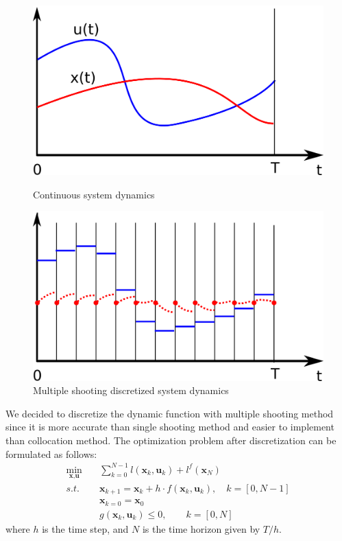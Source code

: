 \documentclass{article}
\begin{document}
\begin{figure}[h!]
    \begin{minipage}{0.4\textwidth}
        \centering
        \includegraphics[width=\textwidth]{images/xu_cont.png}
        \caption{Continuous system dynamics}
        \label{fig:continuous-system-dynamics}
    \end{minipage}
    \hfill
    \begin{minipage}{0.4\textwidth}
        \centering
        \includegraphics[width=\textwidth]{images/xu_gap.png}
        \caption{Multiple shooting discretized system dynamics}
        \label{fig:multiple-shooting-system-dynamics}
    \end{minipage}
    \label{fig:compare-system-dynamics}
\end{figure}

We decided to discretize the dynamic function with multiple shooting method since it is more accurate than single shooting method and easier to implement than collocation method. The optimization problem after discretization can be formulated as follows:
\begin{align}
    \min_{\textbf{x}, \textbf{u}} \quad & \sum^{N-1}_{k=0} l(\textbf{x}_k, \textbf{u}_k) + l^f(\textbf{x}_N) \\
    s.t. \quad & \textbf{x}_{k+1} = \textbf{x}_k + h \cdot f(\textbf{x}_{k}, \textbf{u}_{k}), \quad k = [0, N-1] \\
    & \textbf{x}_{k=0} = \textbf{x}_0 \\
    & g(\textbf{x}_k, \textbf{u}_k) \leq 0, \quad\quad k=[0, N]
\end{align}
where  $h$ is the time step, and $N$ is the time horizon given by $T/h$.
\end{document}

